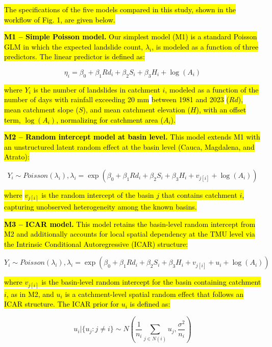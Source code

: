 \documentclass[journal abbreviation, manuscript]{copernicus}
\newcommand{\hlE}[1]{{\sethlcolor{edcyan}\hl{#1}}}
\begin{document}
\hl{The specifications of the five models compared in this study, shown in the workflow of Fig. 1, are given below.}

\hl{\textbf{M1 -- Simple Poisson model.} Our simplest model (M1) is a standard Poisson GLM in which the expected landslide count, $\lambda_i$, is modeled as a function of three predictors. The linear predictor is defined as:}

\begin{equation}
\eta_i = \beta_0 + \beta_1 Rd_i + \beta_2 S_i + \beta_3 H_i + \log(A_i)
\end{equation}

\hl{where $Y_i$ is the number of landslides in catchment $i$, modeled as a function of the number of days with rainfall exceeding 20 mm} \hlE{between 1981 and 2023} \hl{($Rd$), mean catchment slope ($S$), and mean catchment elevation ($H$), with an offset term, $\log(A_i)$, normalizing for catchment area ($A_i$).}

\hl{\textbf{M2 -- Random intercept model at basin level.} This model extends M1 with an unstructured latent random effect at the basin level (Cauca, Magdalena, and Atrato):}

\begin{equation}
Y_i \sim Poisson(\lambda_i), \lambda_i = \exp(\beta_0 + \beta_1 Rd_i + \beta_2 S_i + \beta_3 H_i + v_{j[i]} + \log(A_i))
\end{equation}

\hl{where} \hlE{$v_{j[i]}$ is the random intercept of the basin $j$ that contains catchment $i$,} \hl{capturing unobserved heterogeneity among the known basins.}

\hl{\textbf{M3 -- ICAR model.} This model retains the basin-level random intercept from M2 and additionally accounts for local spatial dependency at the TMU level via the Intrinsic Conditional Autoregressive (ICAR) structure:}

\begin{equation}
Y_i \sim Poisson(\lambda_i), \lambda_i = \exp(\beta_0 + \beta_1 Rd_i + \beta_2 S_i + \beta_3 H_i + v_{j[i]} + u_i + \log(A_i))
\end{equation}

\hl{where $v_{j[i]}$ is the basin-level random intercept for the basin containing catchment $i$, as in M2, and $u_i$ is a catchment-level spatial random effect that follows an ICAR structure. The ICAR prior for $u_i$ is defined as:}

\begin{equation}
u_i | \{u_j : j \neq i\} \sim N \left( \frac{1}{n_i} \sum_{j \in N(i)} u_j, \frac{\sigma^2}{n_i} \right)
\end{equation}
\end{document}
